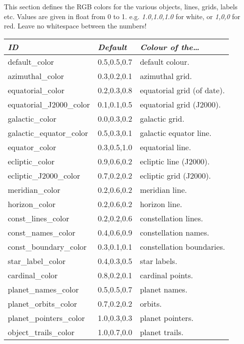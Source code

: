 This section defines the RGB colors for the various objects, lines,
grids, labels etc. Values are given in float from 0 to
1. e.g. \emph{1.0,1.0,1.0} for white, or \emph{1,0,0} for red. Leave
no whitespace between the numbers!

\begin{longtabu} to \textwidth {l|l|X}
\toprule
\emph{ID} & \emph{Default} & \emph{Colour of the\ldots}\tabularnewline
\midrule
default\_color           & 0.5,0.5,0.7 & default colour.\\\midrule
azimuthal\_color         & 0.3,0.2,0.1 &  azimuthal grid. \\\midrule
equatorial\_color        & 0.2,0.3,0.8 &  equatorial grid (of date). \\\midrule
equatorial\_J2000\_color & 0.1,0.1,0.5 &  equatorial grid (J2000). \\\midrule
galactic\_color          & 0.0,0.3,0.2 &  galactic grid. \\\midrule
galactic\_equator\_color & 0.5,0.3,0.1 &  galactic equator line. \\\midrule
equator\_color           & 0.3,0.5,1.0 &  equatorial line. \\\midrule
ecliptic\_color          & 0.9,0.6,0.2 &  ecliptic line (J2000). \\\midrule
ecliptic\_J2000\_color   & 0.7,0.2,0.2 &  ecliptic grid (J2000). \\\midrule
meridian\_color          & 0.2,0.6,0.2 &  meridian line. \\\midrule
horizon\_color           & 0.2,0.6,0.2 &  horizon line. \\\midrule
const\_lines\_color      & 0.2,0.2,0.6 &  constellation lines. \\\midrule
const\_names\_color      & 0.4,0.6,0.9 &  constellation names. \\\midrule
const\_boundary\_color   & 0.3,0.1,0.1 &  constellation boundaries. \\\midrule
star\_label\_color       & 0.4,0.3,0.5 &  star labels. \\\midrule
cardinal\_color          & 0.8,0.2,0.1 &  cardinal points. \\\midrule
planet\_names\_color     & 0.5,0.5,0.7 &  planet names. \\\midrule
planet\_orbits\_color    & 0.7,0.2,0.2 &  orbits. \\\midrule
planet\_pointers\_color  & 1.0,0.3,0.3 &  planet pointers. \\\midrule
object\_trails\_color    & 1.0,0.7,0.0 &  planet trails. \\\midrule

\end{longtabu}
